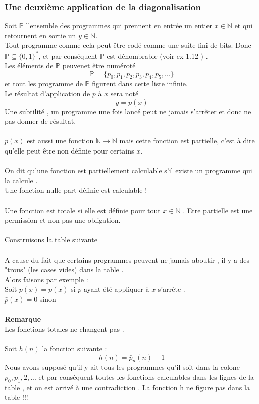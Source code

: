 \documentclass[base.tex]{subfiles}
\begin{document}
\subsubsection{Une deuxième application de la diagonalisation}
Soit $\mathbb{P}$ l'ensemble des programmes qui prennent en entrée un entier $x \in \mathbb{N}$ et qui retournent en sortie un $y\in \mathbb{N}$.\\
Tout programme comme cela peut être codé comme une suite fini de bits. Donc $\mathbb{P}\subseteq \{0,1\}^*$, et par conséquent $\mathbb{P}$ est dénombrable (voir ex 1.12 ) . \\
Les éléments de $\mathbb{P}$ peuvenet être numéroté
\[\mathbb{P} = \{p_0,p_1,p_2,p_3,p_4,p_5,...\}\]
et tout les programme de $\mathbb{P}$ figurent dans cette liste infinie.\\
Le résultat d'application de $p$ à $x$ sera noté
\[y=p(x)\]
Une subtilité , un programme une fois lancé peut ne jamais s'arrêter et donc ne pas donner de résultat.\\
\\
$p(x)$ est aussi une fonction $\mathbb{N} \rightarrow \mathbb{N}$ mais cette fonction est \underline{partielle}, c'est à dire qu'elle peut être non définie pour certains $x$. \\
\\
On dit qu'une fonction est partiellement calculable s'il existe un programme qui la calcule .\\
Une fonction nulle part définie est calculable !\\
\\
Une fonction est totale si elle est définie pour tout $x \in \mathbb{N}$ . Etre partielle est une permission et non pas une obligation.\\
\\
Construisons la table suivante
\\
\\
A cause du fait que certains programmes peuvent ne jamais aboutir , il y a des "trous" (les cases vides) dans la table .\\
Alors faisons par exemple :\\
Soit $\bar{p}(x)=p(x) $ si $p$ ayant été appliquer à $x$ s'arrête .\\
$\bar{p}(x) = 0$ sinon \\
\\
\textbf{Remarque}\\
Les fonctions totales ne changent pas .\\
\\
Soit $h(n)$ la fonction suivante :
\[h(n)=\bar{p}_n(n)+1\]
Nous avons supposé qu'il y ait tous les programmes qu'il soit dans la colone $p_0,p_1,2,...$ et par conséquent toutes les fonctions calculables dans les lignes de la table , et on est arrivé à une contradiction . La fonction h ne figure pas dans la table !!!
\end{document}
